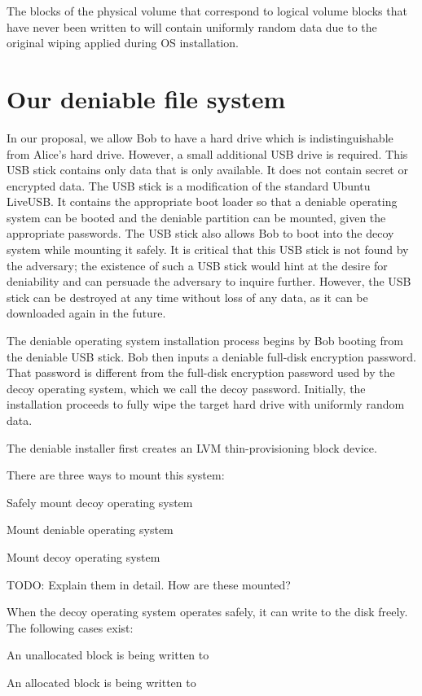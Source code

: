 \documentclass{acm_proc_article-sp}
\begin{document}
The blocks of the physical volume that correspond to logical volume blocks that
have never been written to will contain uniformly random data due to the
original wiping applied during OS installation.

\section{Our deniable file system}

In our proposal, we allow Bob to have a hard drive which is indistinguishable
from Alice’s hard drive. However, a small additional USB drive is required.
This USB stick contains only data that is only available. It does not contain
secret or encrypted data. The USB stick is a modification of the standard
Ubuntu LiveUSB. It contains the appropriate boot loader so that a deniable
operating system can be booted and the deniable partition can be mounted, given
the appropriate passwords. The USB stick also allows Bob to boot into the decoy
system while mounting it safely. It is critical that this USB stick is not
found by the adversary; the existence of such a USB stick would hint at the
desire for deniability and can persuade the adversary to inquire further.
However, the USB stick can be destroyed at any time without loss of any data,
as it can be downloaded again in the future.

The deniable operating system installation process begins by Bob booting from
the deniable USB stick. Bob then inputs a deniable full-disk encryption
password. That password is different from the full-disk encryption password
used by the decoy operating system, which we call the decoy password.
Initially, the installation proceeds to fully wipe the target hard drive with
uniformly random data.

The deniable installer first creates an LVM thin-provisioning block device.

There are three ways to mount this system:

Safely mount decoy operating system

Mount deniable operating system

Mount decoy operating system

TODO: Explain them in detail. How are these mounted?

When the decoy operating system operates safely, it can write to the disk
freely. The following cases exist:

An unallocated block is being written to

An allocated block is being written to
\end{document}

